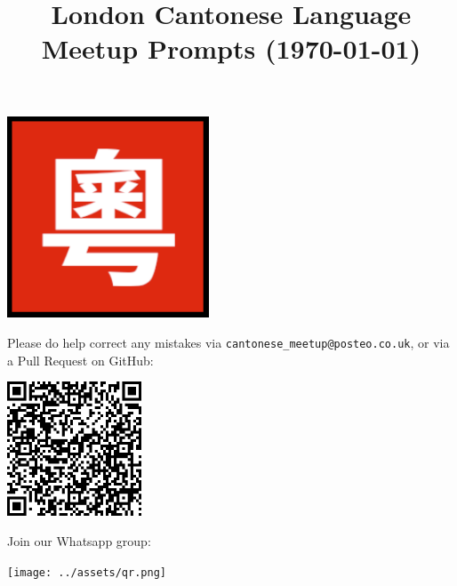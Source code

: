 \title{\vspace{-0.5cm}\large\bfseries London Cantonese Language Meetup Prompts (\today{})}
\author{}
\date{}
\maketitle

\vspace{-2cm}

\begin{center}
  \includegraphics[width=0.45\textwidth]{../assets/logo.png}
\end{center}

Please do help correct any mistakes via \texttt{cantonese\_meetup@posteo.co.uk}, or via a Pull Request on GitHub:

\begin{center}
  \includegraphics[width=0.30\textwidth]{../assets/github.png}
\end{center}

Join our Whatsapp group:

\begin{center}
  \texttt{[image: ../assets/qr.png]}
\end{center}

